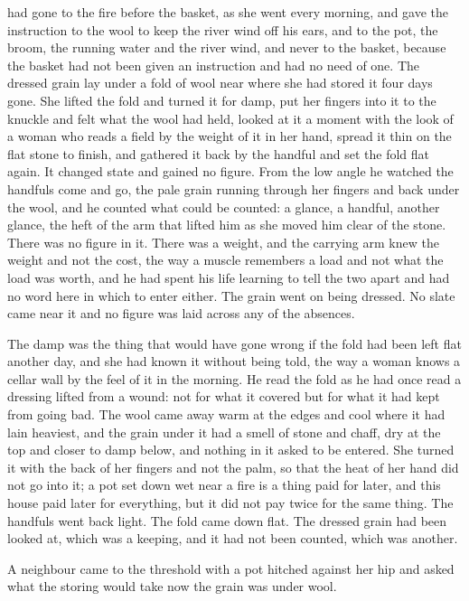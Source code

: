  had gone to the fire before the basket, as she went every morning, and gave the instruction to the wool to keep the river wind off his ears, and to the pot, the broom, the running water and the river wind, and never to the basket, because the basket had not been given an instruction and had no need of one. The dressed grain lay under a fold of wool near  where she had stored it four days gone. She lifted the fold and turned it for damp, put her fingers into it to the knuckle and felt what the wool had held, looked at it a moment with the look of a woman who reads a field by the weight of it in her hand, spread it thin on the flat stone to finish, and gathered it back by the handful and set the fold flat again. It changed state and gained no figure. From the low angle he watched the handfuls come and go, the pale grain running through her fingers and back under the wool, and he counted what could be counted: a glance, a handful, another glance, the heft of the arm that lifted him as she moved him clear of the stone. There was no figure in it. There was a weight, and the carrying arm knew the weight and not the cost, the way a muscle remembers a load and not what the load was worth, and he had spent his life learning to tell the two apart and had no word here in which to enter either. The grain went on being dressed. No slate came near it and no figure was laid across any of the absences.

The damp was the thing that would have gone wrong if the fold had been left flat another day, and she had known it without being told, the way a woman knows a cellar wall by the feel of it in the morning. He read the fold as he had once read a dressing lifted from a wound: not for what it covered but for what it had kept from going bad. The wool came away warm at the edges and cool where it had lain heaviest, and the grain under it had a smell of stone and chaff, dry at the top and closer to damp below, and nothing in it asked to be entered. She turned it with the back of her fingers and not the palm, so that the heat of her hand did not go into it; a pot set down wet near a fire is a thing paid for later, and this house paid later for everything, but it did not pay twice for the same thing. The handfuls went back light. The fold came down flat. The dressed grain had been looked at, which was a keeping, and it had not been counted, which was another.

A neighbour came to the threshold with a pot hitched against her hip and asked what the storing would take now the grain was under wool.

